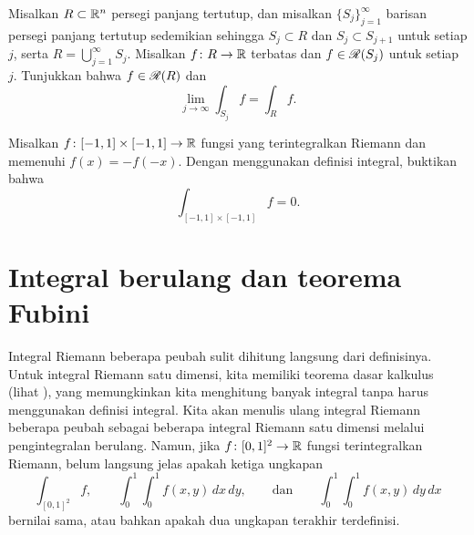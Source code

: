 \begin{exercise}
Misalkan $R \subset {\mathbb{R}}^n$ persegi panjang tertutup, dan misalkan
$\{ S_j \}_{j=1}^\infty$ barisan persegi panjang tertutup sedemikian sehingga
$S_j \subset R$ dan $S_j \subset S_{j+1}$ untuk setiap $j$, serta
$R = \bigcup_{j=1}^\infty S_j$. Misalkan $f \colon R \to {\mathbb{R}}$ terbatas dan
$f \in {\mathscr{R}}(S_j)$ untuk setiap $j$. Tunjukkan bahwa $f \in {\mathscr{R}}(R)$ dan
\begin{equation*}
\lim_{j\to\infty} \int_{S_j} f = \int_R f .
\end{equation*}
\end{exercise}

\begin{exercise}
Misalkan $f\colon [-1,1] \times [-1,1] \to {\mathbb{R}}$ fungsi yang terintegralkan
Riemann dan memenuhi $f(x) = -f(-x)$. Dengan menggunakan definisi integral,
buktikan bahwa
\begin{equation*}
\int_{[-1,1] \times [-1,1]} f = 0 .
\end{equation*}
\end{exercise}


\sectionnewpage
\section{Integral berulang dan teorema Fubini}
\label{sec:iteratedints}


Integral Riemann beberapa peubah sulit dihitung langsung dari definisinya.
Untuk integral Riemann satu dimensi, kita memiliki teorema dasar kalkulus
(lihat ),
yang memungkinkan kita menghitung banyak integral tanpa harus menggunakan
definisi integral. Kita akan menulis ulang integral Riemann beberapa peubah
sebagai beberapa integral Riemann satu dimensi melalui pengintegralan
berulang. Namun, jika $f \colon [0,1]^2 \to {\mathbb{R}}$ fungsi terintegralkan Riemann,
belum langsung jelas apakah ketiga ungkapan
\begin{equation*}
\int_{[0,1]^2} f ,
\qquad
\int_0^1 \int_0^1 f(x,y) \, dx \, dy ,
\qquad \text{dan}
\qquad
\int_0^1 \int_0^1 f(x,y) \, dy \, dx
\end{equation*}
bernilai sama, atau bahkan apakah dua ungkapan terakhir terdefinisi.

